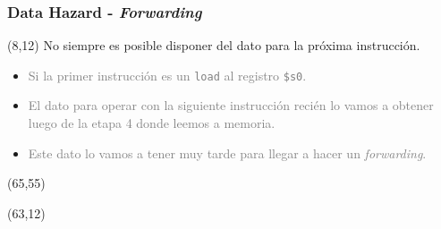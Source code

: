 \documentclass[aspectratio=169]{beamer}
\begin{document}
\begin{frame}[t,fragile]
    \frametitle{Data Hazard - \emph{Forwarding}}
    \begin{textblock}{50}(8,12)
    \small
    No siempre es posible disponer del dato para la próxima instrucción.\\
    \bigskip
    \begin{itemize}
    \item<2-> \textcolor{gray}{Si la primer instrucción es un \texttt{load} al registro \texttt{\$s0}.}
    \item<3-> \textcolor{gray}{El dato para operar con la siguiente instrucción recién lo vamos a obtener luego de la etapa 4 donde leemos a memoria.}
    \item<4-> \textcolor{gray}{Este dato lo vamos a tener muy tarde para llegar a hacer un \emph{forwarding}.}
    \end{itemize}
    \end{textblock}
    \begin{textblock}{85}(65,55)
    \small
    \bigskip
    \end{textblock}
    \begin{textblock}{10}(63,12)
    \end{textblock}
\end{frame}
\end{document}
